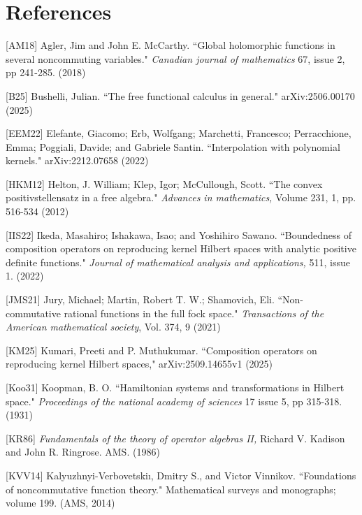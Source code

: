 \documentclass[12pt]{amsart}
\theoremstyle{definition}
\numberwithin{equation}{section}
\begin{document}

\newpage

\section{References}

[AM18] Agler, Jim and John E. McCarthy. ``Global holomorphic functions in several noncommuting variables." \textit{Canadian journal of mathematics} 67, issue 2, pp 241-285. (2018)

[B25] Bushelli, Julian. ``The free functional calculus in general." arXiv:2506.00170 (2025)

[EEM22] Elefante, Giacomo; Erb, Wolfgang; Marchetti, Francesco; Perracchione, Emma; 
Poggiali, Davide; and Gabriele Santin. ``Interpolation with polynomial kernels." 	arXiv:2212.07658 (2022)

[HKM12] Helton, J. William; Klep, Igor; McCullough, Scott. ``The convex positivstellensatz in a free algebra." \textit{Advances in mathematics,}
 Volume 231, 1, pp. 516-534 (2012)

[IIS22] Ikeda, Masahiro; Ishakawa, Isao; and Yoshihiro Sawano. ``Boundedness of composition operators on reproducing kernel Hilbert spaces with analytic positive definite functions." \textit{Journal of mathematical analysis and applications,} 511, issue 1. (2022)

[JMS21] Jury, Michael; Martin, Robert T. W.; Shamovich, Eli. ``Non-commutative rational functions in the full fock space." \textit{Transactions of the American mathematical society}, Vol. 374, 9 (2021)

[KM25] Kumari, Preeti and P. Muthukumar. ``Composition operators on reproducing kernel Hilbert spaces,"  arXiv:2509.14655v1 (2025)

[Koo31] Koopman, B. O. ``Hamiltonian systems and transformations in Hilbert space." \textit{Proceedings of the national academy of sciences} 17 issue 5, pp 315-318. (1931)

[KR86] \textit{Fundamentals of the theory of operator algebras II,} Richard V. Kadison and John R. Ringrose. AMS. (1986)

[KVV14] Kalyuzhnyi-Verbovetski\i, Dmitry S., and Victor Vinnikov. ``Foundations of noncommutative function theory." Mathematical surveys and monographs; volume 199. (AMS, 2014) 
\end{document}
